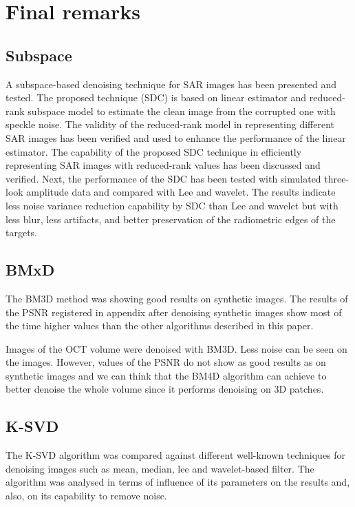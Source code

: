 \section{Final remarks} \label{sc:final-remarks}

\subsection{Subspace}
A subspace-based denoising technique for SAR images has been presented and tested. The proposed technique (SDC) is based on linear estimator and reduced-rank
subspace model to estimate the clean image from the corrupted one with speckle noise. The validity of the reduced-rank model in representing different SAR images
has been verified and used to enhance the performance of the linear estimator. The capability of the proposed SDC technique in efficiently representing SAR images
with reduced-rank values has been discussed and verified. Next, the performance of the SDC has been tested with simulated three-look amplitude data and compared with Lee and wavelet. The results indicate less noise variance reduction capability by SDC than Lee and wavelet but with less blur, less artifacts, and better preservation of the radiometric edges of the targets.

\subsection{BMxD}
The BM3D method was showing good results on synthetic images. The results of the PSNR registered in appendix after denoising synthetic images show most of the time higher values than the other algorithms described in this paper. 

Images of the OCT volume were denoised with BM3D. Less noise can be seen on the images. However, values of the PSNR do not show as good results as on synthetic images and we can think that the BM4D algorithm can achieve to better denoise the whole volume since it performs denoising on 3D patches. 

\subsection{K-SVD}
The K-SVD algorithm was compared against different well-known techniques for denoising images such as mean, median, lee and wavelet-based filter. The algorithm was analysed in terms of influence of its parameters on the results and, also, on its capability to remove noise.

